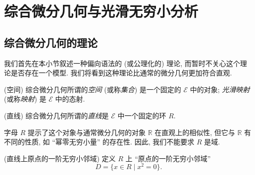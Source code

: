 \section{综合微分几何与光滑无穷小分析}

\subsection{综合微分几何的理论}

我们首先在本小节叙述一种偏向语法的 (或公理化的) 理论, 而暂时不关心这个理论是否存在一个模型. 我们将看到这种理论比通常的微分几何更加符合直观.

\begin{axiom}
	{(空间)}
	综合微分几何所谓的\emph{空间} (或称\emph{集合}) 是一个固定的\topos{} $\mathcal E$ 中的对象; \emph{光滑映射} (或称\emph{映射}) 是 $\mathcal E$ 中的态射.
\end{axiom}

\begin{axiom}
	{(直线)}
	综合微分几何所谓的\emph{直线}是 $\mathcal E$ 中一个固定的环 $R$.
\end{axiom}

\begin{remark}
	{}
	字母 $R$ 提示了这个对象与通常微分几何的对象 $\mathbb{R}$ 在直观上的相似性, 但它与 $\mathbb{R}$ 有不同的性质, 如 ``幂零无穷小量'' 的存在性. 因此, 我们不能要求 $R$ 是域.
\end{remark}

\begin{definition}
	{(直线上原点的一阶无穷小邻域)}
	定义 $R$ 上 ``原点的一阶无穷小邻域''
	$$
	D = \{x \in R \mid x^2 = 0\}.
	$$
\end{definition}

